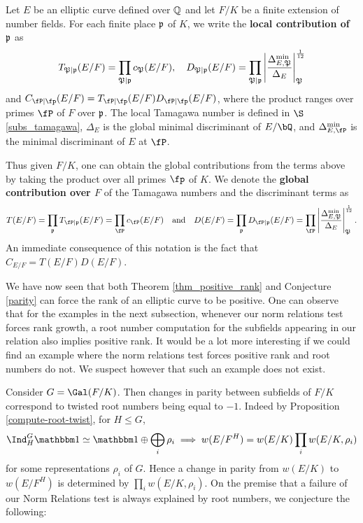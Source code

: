 \begin{notation}\label{not_contr}
    Let $E$ be an elliptic curve defined over $\mathbb{Q}$ and let $F/K$ be a finite extension of number fields. For each finite place $\mathfrak{p}$ of $K$, we write the \textbf{local contribution of $\mathfrak{p}$} as 
    $$T_{\mathfrak{P}\mid\mathfrak{p}}(E/F)=\prod_{\mathfrak{P}\mid\mathfrak{p}}c_\mathfrak{P}(E/F),\quad D_{\mathfrak{P}\mid\mathfrak{p}}(E/F)=\prod_{\mathfrak{P}\mid\mathfrak{p}}\left|\frac{\Delta_{E,\mathfrak{P}}^{\min}}{\Delta_E}\right|_\mathfrak{P}^{\frac{1}{12}}$$ 
    and $C_{\fP\mid\fp}(E/F)=T_{\fP\mid\fp}(E/F)D_{\fP\mid\fp}(E/F)$, where the product ranges over primes $\fP$ of $F$ over $\mathfrak{p}$. The local Tamagawa number is defined in $\S$\ref{subs_tamagawa}, $\Delta_E$ is the global minimal discriminant of $E / \bQ$, and $\Delta_{E, \fP}^{\min}$ is the minimal discriminant of $E$ at $\fP$. 

    Thus given $F / K$, one can obtain the global contributions from the terms above by taking the product over all primes $\fp$ of $K$. We denote the \textbf{global contribution over $F$} of the Tamagawa numbers and the discriminant terms as 
    $$T(E/F)=\prod_\pp T_{\fP\mid\pp}(E/F)=\prod_\fP c_\fP(E/F)\quad\text{and}\quad D(E/F)=\prod_\pp D_{\fP\mid\pp}(E/F)=\prod_\fP \left|\frac{\Delta_{E,\mathfrak{P}}^{\min}}{\Delta_E}\right|_\mathfrak{P}^{\frac{1}{12}}.$$ 
An immediate consequence of this notation is the fact that $C_{E/F}=T(E/F)D(E/F)$.
\end{notation}

We have now seen that both Theorem \ref{thm_positive_rank} and Conjecture \ref{parity} can force the rank of an elliptic curve to be positive. One can observe that for the examples in the next subsection, whenever our norm relations test forces rank growth, a root number computation for the subfields appearing in our relation also implies positive rank. 
It would be a lot more interesting if we could find an example where the norm relations test forces positive rank and root numbers do not. 
We suspect however that such an example does not exist. 

Consider $G = \Gal(F / K)$. Then changes in parity between subfields of $F / K$ correspond to twisted root numbers being equal to $-1$. Indeed by Proposition \ref{compute-root-twist}, for $H \leq G$, 
\[ \Ind_{H}^G \trivial \simeq \trivial\oplus \bigoplus_i \rho_i  \implies w(E / F^H) = w(E / K)\prod_i w(E / K, \rho_i) \] for some representations $\rho_i $ of $G $. Hence a change in parity from $w(E / K)$ to $w(E / F^H)$ is determined by $\prod_i w(E / K, \rho_i)$. On the premise that a failure of our Norm Relations test is always explained by root numbers, we conjecture the following:

